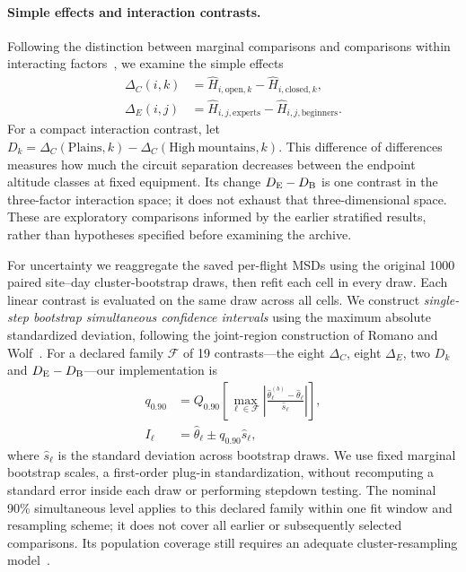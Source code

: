 \paragraph{Simple effects and interaction contrasts.}
Following the distinction between marginal comparisons and comparisons within
interacting factors~\cite[Section~9.4]{mohr2022statistical}, we examine the
simple effects
\begin{equation}
 \begin{aligned}
 \Delta_C(i,k)&=\widehat H_{i,\mathrm{open},k}
                 -\widehat H_{i,\mathrm{closed},k},\\
 \Delta_E(i,j)&=\widehat H_{i,j,\mathrm{experts}}
                 -\widehat H_{i,j,\mathrm{beginners}}.
 \end{aligned}
 \label{eq:factorial-simple}
\end{equation}
For a compact interaction contrast, let
$D_k=\Delta_C(\mathrm{Plains},k)-\Delta_C(\mathrm{High\ mountains},k)$.
This difference of differences measures how much the circuit separation
decreases between the endpoint altitude classes at fixed equipment. Its change
$D_{\rm E}-D_{\rm B}$ is one contrast in the three-factor interaction space;
it does not exhaust that three-dimensional space. These are exploratory
comparisons informed by the earlier stratified results, rather than hypotheses
specified before examining the archive.

For uncertainty we reaggregate the saved per-flight MSDs using the original
1000 paired site--day cluster-bootstrap draws, then refit each cell in every
draw. Each linear contrast is evaluated on the same draw across all cells.
We construct \emph{single-step bootstrap simultaneous confidence intervals}
using the maximum absolute standardized deviation, following the joint-region
construction of Romano and Wolf~\cite[Sections~3--5]{romano_wolf2005}.
For a declared family $\mathcal F$ of 19 contrasts---the eight $\Delta_C$,
eight $\Delta_E$, two $D_k$ and $D_{\rm E}-D_{\rm B}$---our implementation is
\begin{equation}
 \begin{aligned}
 q_{0.90}&=Q_{0.90}\!\left[
  \max_{\ell\in\mathcal F}
  \left|\frac{\widehat\theta_\ell^{(b)}-\widehat\theta_\ell}
                  {\widehat s_\ell}\right|\right],\\
 I_\ell&=\widehat\theta_\ell\pm q_{0.90}\widehat s_\ell,
 \end{aligned}
 \label{eq:factorial-simultaneous}
\end{equation}
where $\widehat s_\ell$ is the standard deviation across bootstrap draws.
We use fixed marginal bootstrap scales, a first-order plug-in standardization,
without recomputing a standard error inside each draw or performing stepdown
testing. The nominal 90\% simultaneous level applies to this declared family
within one fit window and resampling scheme; it does not cover all earlier or
subsequently selected comparisons. Its population coverage still requires an
adequate cluster-resampling model~\cite{cameron_miller2015}.

